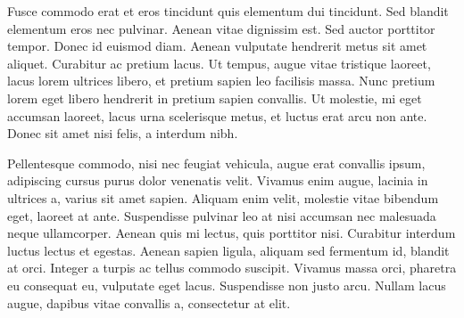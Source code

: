 \documentclass[a4paper,9pt]{scrartcl}
\begin{document}
Fusce commodo erat et eros tincidunt quis elementum dui tincidunt. Sed blandit elementum eros nec pulvinar. Aenean vitae dignissim est. Sed auctor porttitor tempor. Donec id euismod diam. Aenean vulputate hendrerit metus sit amet aliquet. Curabitur ac pretium lacus. Ut tempus, augue vitae tristique laoreet, lacus lorem ultrices libero, et pretium sapien leo facilisis massa. Nunc pretium lorem eget libero hendrerit in pretium sapien convallis. Ut molestie, mi eget accumsan laoreet, lacus urna scelerisque metus, et luctus erat arcu non ante. Donec sit amet nisi felis, a interdum nibh.

Pellentesque commodo, nisi nec feugiat vehicula, augue erat convallis ipsum, adipiscing cursus purus dolor venenatis velit. Vivamus enim augue, lacinia in ultrices a, varius sit amet sapien. Aliquam enim velit, molestie vitae bibendum eget, laoreet at ante. Suspendisse pulvinar leo at nisi accumsan nec malesuada neque ullamcorper. Aenean quis mi lectus, quis porttitor nisi. Curabitur interdum luctus lectus et egestas. Aenean sapien ligula, aliquam sed fermentum id, blandit at orci. Integer a turpis ac tellus commodo suscipit. Vivamus massa orci, pharetra eu consequat eu, vulputate eget lacus. Suspendisse non justo arcu. Nullam lacus augue, dapibus vitae convallis a, consectetur at elit.
\end{document}
